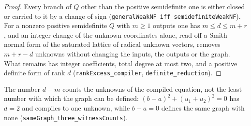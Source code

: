 \begin{proof}
Every branch of $Q$ other than the positive semidefinite one is either closed or carried to it by a change of sign (\texttt{generalWeakNF\_iff\_semidefiniteWeakNF}). For a nonzero positive semidefinite $Q$ with $m ≥ 1$ outputs one has $m ≤ d ≤ m + r$, and an integer change of the unknown coordinates alone, read off a Smith normal form of the saturated lattice of radical unknown vectors, removes $m + r - d$ unknowns without changing the inputs, the outputs or the graph. What remains has integer coefficients, total degree at most two, and a positive definite form of rank $d$ (\texttt{rankExcess\_compiler}, \texttt{definite\_reduction}).
\end{proof}

The number $d - m$ counts the unknowns of the compiled equation, not the least number with which the graph can be defined: $(b - a)^{2} + (u_{1} + u_{2})^{2} = 0$ has $d = 2$ and compiles to one unknown, while $b - a = 0$ defines the same graph with none (\texttt{sameGraph\_three\_witnessCounts}).



